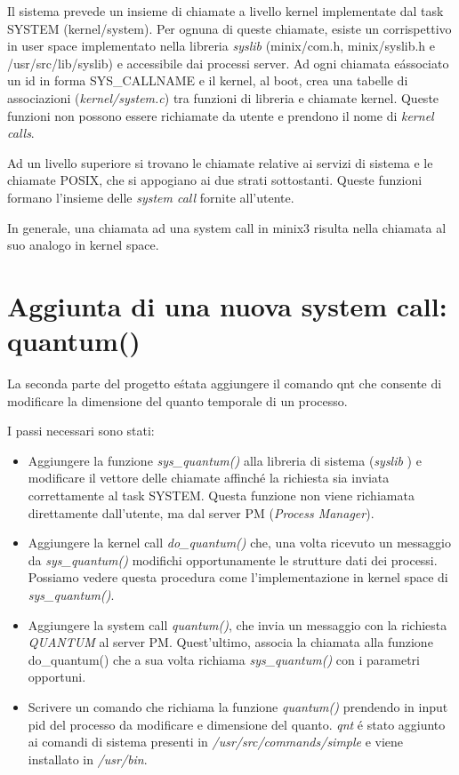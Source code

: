 \documentclass[a4paper,12pt]{report}
\begin{document}
Il sistema prevede un insieme di chiamate a livello kernel implementate dal
task SYSTEM (kernel/system). Per ognuna di queste chiamate, esiste un
corrispettivo in user space implementato nella libreria \textit{syslib}
(minix/com.h, minix/syslib.h e /usr/src/lib/syslib) e accessibile dai
processi server.
Ad ogni chiamata e\' associato un id in forma SYS\_CALLNAME 
e il kernel, al boot, crea una tabelle di associazioni
(\textit{kernel/system.c}) tra funzioni di libreria e 
chiamate kernel.
Queste funzioni non possono essere richiamate da utente e prendono il nome
di \textit{kernel calls}.

Ad un livello superiore si trovano le chiamate relative ai servizi di
sistema e le chiamate POSIX, che si appogiano ai due strati sottostanti.
Queste funzioni formano l'insieme delle \textit{system call} fornite all'utente.

In generale, una chiamata ad una system call in minix3 risulta nella
chiamata al suo analogo in kernel space.

\section{Aggiunta di una nuova system call: quantum()}

La seconda parte del progetto e\' stata aggiungere il comando qnt che
consente di modificare la dimensione del quanto temporale di un processo.

I passi necessari sono stati:
\begin{itemize}
\item Aggiungere la funzione \textit{sys\_quantum()} alla libreria di sistema
(\textit{syslib} ) e
modificare il vettore delle chiamate affinch\'e la richiesta sia inviata
correttamente al task SYSTEM. Questa funzione non viene richiamata
direttamente dall'utente, ma dal server PM (\textit{Process Manager}).
\item Aggiungere la kernel call \textit{do\_quantum()} che, una volta ricevuto
un messaggio da \textit{sys\_quantum()} modifichi opportunamente le strutture
dati dei processi. Possiamo vedere questa procedura come l'implementazione in
kernel space di \textit{sys\_quantum()}.
\item Aggiungere la system call \textit{quantum()}, che invia un messaggio con la
richiesta \textit{QUANTUM} al server PM. Quest'ultimo, associa la chiamata alla
funzione do\_quantum() che a sua volta richiama \textit{sys\_quantum()} con i
parametri opportuni.

\item Scrivere un comando  che richiama la funzione
\textit{quantum()} prendendo in input pid del processo da modificare e
dimensione del quanto. \textit{qnt} \'e stato aggiunto ai comandi di sistema
presenti in \textit{/usr/src/commands/simple} e viene installato in
\textit{/usr/bin}.
\end{itemize}
\end{document}
